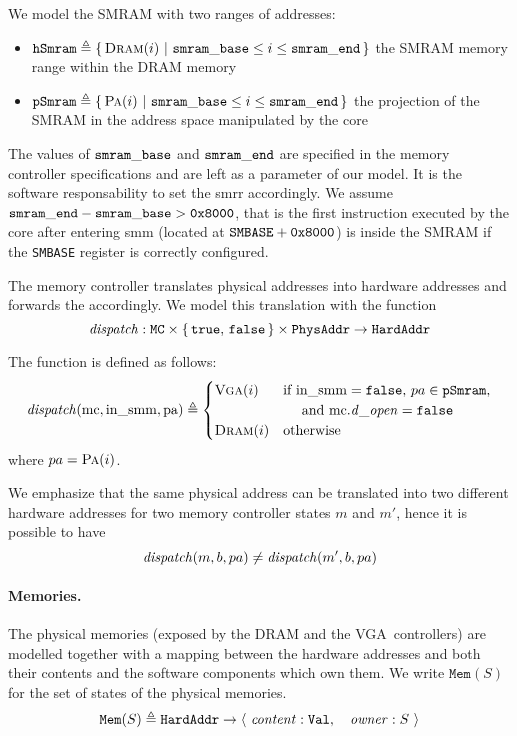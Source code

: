 We model the SMRAM with two ranges of addresses:
%
\begin{itemize}
\item
  $\texttt{hSmram} \triangleq \{\,\textsc{Dram}(i)\ |\ \mathtt{smram\_base} \leq i
    \le \mathtt{smram\_end}\,\}$ the SMRAM memory range within the DRAM memory
%
\item
  $\texttt{pSmram} \triangleq \{\,\textsc{Pa}(i)\ |\ \mathtt{smram\_base} \leq i
    \le \mathtt{smram\_end}\,\}$ the projection of the SMRAM in the address space
  manipulated by the core
\end{itemize}
%
The values of $\mathtt{smram\_base}$ and $\mathtt{smram\_end}$ are specified in the
memory controller specifications and are left as a parameter of our model.
%
It is the software responsability to set the \ac{smrr} accordingly.
%
We assume $\mathtt{smram\_end} - \mathtt{smram\_base} > \mathtt{0x8000}$, that is the
first instruction executed by the core after entering \ac{smm} (located at
$\texttt{SMBASE} + \mathtt{0x8000}$) is inside the SMRAM if the \texttt{SMBASE}
register is correctly configured.

The memory controller translates physical addresses into hardware addresses and
forwards the \IO accordingly.
%
We model this translation with the function
%
\[
  \mathit{dispatch} : \texttt{MC} \times \{\,\mathtt{true},\,\mathtt{false}\,\}
  \times \texttt{PhysAddr} \rightarrow \texttt{HardAddr}
\]
%
\begin{definition}
  \label{def:speccert2:dispatch}

  The function  is defined as follows:
  \[
    \mathit{dispatch}(\mathrm{mc}, \mathrm{in\_smm}, \mathrm{pa}) \triangleq
    \begin{cases}
      \textsc{Vga}(i) & \text{if }\mathrm{in\_smm} = \mathtt{false}\text{, }pa \in
      \texttt{pSmram}\text{,} \\
      & \quad\text{ and } \mathrm{mc}.\mathit{d\_open} = \mathtt{false}  \\
      \textsc{Dram}(i) & \text{otherwise}
    \end{cases}
  \]
%
  \qquad\qquad\qquad\qquad\qquad\qquad where $pa = \textsc{Pa}(i)$.
\end{definition}

We emphasize that the same physical address can be translated into two different
hardware addresses for two memory controller states $m$ and $m'$, hence it is
possible to have
%
\[
  \mathit{dispatch}(m, b, pa) \neq \mathit{dispatch}(m', b, pa)
\]

\paragraph{Memories.}
%
The physical memories (exposed by the DRAM and the VGA controllers)
are modelled together with a mapping between the hardware addresses and both their
contents and the software components which own them.
%
We write $\texttt{Mem}(S)$ for the set of states of the physical memories.
\[
  \texttt{Mem}(S) \triangleq \texttt{HardAddr} \rightarrow
  \langle~\mathit{content}: \texttt{Val},\quad\mathit{owner}: S~\rangle
\]

